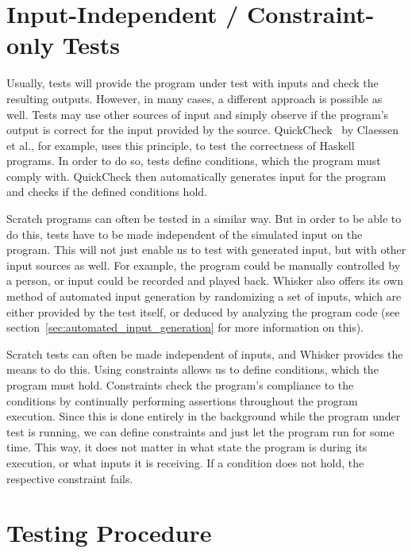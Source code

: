 \section{Input-Independent / Constraint-only Tests}
\label{sec:input_independent_constraint_only_tests}

Usually, tests will provide the program under test with inputs and check the resulting outputs.
However, in many cases, a different approach is possible as well.
Tests may use other sources of input and simply observe if the program's output is correct for the input provided by the source.
QuickCheck~\cite{quickcheck} by Claessen et al., for example, uses this principle, to test the correctness of Haskell programs.
In order to do so, tests define conditions, which the program must comply with.
QuickCheck then automatically generates input for the program and checks if the defined conditions hold.
\parspace

Scratch programs can often be tested in a similar way.
But in order to be able to do this, tests have to be made independent of the simulated input on the program.
This will not just enable us to test with generated input, but with other input sources as well.
For example, the program could be manually controlled by a person, or input could be recorded and played back.
Whisker also offers its own method of automated input generation by randomizing a set of inputs,
which are either provided by the test itself, or deduced by analyzing the program code (see section~\ref{sec:automated_input_generation} for more information on this).
\parspace

Scratch tests can often be made independent of inputs, and Whisker provides the means to do this.
Using constraints allows us to define conditions, which the program must hold.
Constraints check the program's compliance to the conditions by continually performing assertions throughout the program execution.
Since this is done entirely in the background while the program under test is running, we can define constraints and just let the program run for some time.
This way, it does not matter in what state the program is during its execution, or what inputs it is receiving.
If a condition does not hold, the respective constraint fails.

\section{Testing Procedure}
\label{sec:constraint_testing_procedure}

